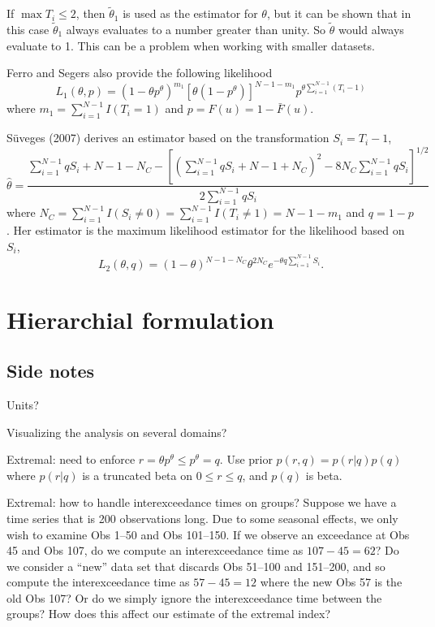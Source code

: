 \documentclass[12pt]{article}
\begin{document}
If $\max{T_i}\leq 2$, then $\tilde{\theta}_1$ is used as the estimator for $\theta$, but it can be shown that in this case $\tilde{\theta}_1$ always evaluates to a number greater than unity. So $\widetilde{\theta}$ would always evaluate to 1. This can be a problem when working with smaller datasets.
\bigskip

Ferro and Segers also provide the following likelihood
\[ L_1(\theta, p) = (1-\theta p^\theta)^{m_1}[\theta(1-p^\theta)]^{N-1-m_1}p^{\theta\sum_{i=1}^{N-1}(T_i-1)} \]
where $m_1=\sum_{i=1}^{N-1}I(T_i=1)$ and $p=F(u)=1-\bar{F}(u)$.
\bigskip

S{\"u}veges (2007) derives an estimator based on the transformation $S_i=T_i-1$,
\[ \hat{\theta} = \frac{ \sum_{i=1}^{N-1}qS_i +N-1-N_C-\left[\left(\sum_{i=1}^{N-1}qS_i+N-1+N_C\right)^2-8N_C\sum_{i=1}^{N-1}qS_i\right]^{1/2}}{2\sum_{i=1}^{N-1}qS_i} \]
where $N_C=\sum_{i=1}^{N-1}I(S_i\neq 0)=\sum_{i=1}^{N-1}I(T_i \neq 1)=N-1-m_1$ and $q=1-p$. Her estimator is the maximum likelihood estimator for the likelihood based on $S_i$,
\[ L_2(\theta, q)= (1-\theta)^{N-1-N_C}\theta^{2N_C}e^{-\theta q \sum_{i=1}^{N-1}S_i}. \]
\bigskip


\section{Hierarchial formulation}





\subsection*{Side notes}

Units?
\bigskip

Visualizing the analysis on several domains?
\bigskip

Extremal: need to enforce $r = \theta p^\theta \leq p^\theta = q$. Use prior $p(r,q)=p(r|q)p(q)$ where $p(r|q)$ is a truncated beta on $0\leq r \leq q$, and $p(q)$ is beta.
\bigskip

Extremal: how to handle interexceedance times on groups? Suppose we have a time series that is 200 observations long. Due to some seasonal effects, we only wish to examine Obs 1--50 and Obs 101--150. If we observe an exceedance at Obs 45 and Obs 107, do we compute an interexceedance time as $107-45=62$? Do we consider a ``new'' data set that discards Obs 51--100 and 151--200, and so compute the interexceedance time as $57-45=12$ where the new Obs 57 is the old Obs 107? Or do we simply ignore the interexceedance time between the groups? How does this affect our estimate of the extremal index?
\end{document}
